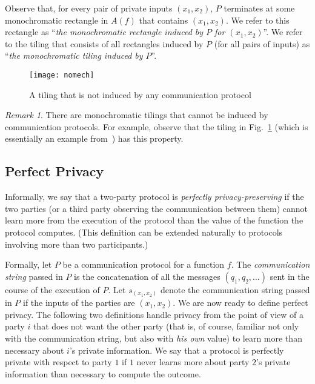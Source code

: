 \documentclass{article}
\theoremstyle{theorem}
\theoremstyle{definition}
\theoremstyle{remark}
\newtheorem{remark}[theorem]{Remark}
\begin{document}
Observe that, for every pair of private inputs $(x_1,x_2)$, $P$
terminates at some monochromatic rectangle in $A(f)$ that contains
$(x_1,x_2)$. We refer to this rectangle as ``\emph{the monochromatic
rectangle induced by $P$ for $(x_1,x_2)$}''. We refer to the tiling
that consists of all rectangles induced by $P$ (for all pairs of
inputs) as  ``\emph{the monochromatic tiling induced by $P$}''.


\begin{figure}[htp]
\begin{center}
\texttt{[image: nomech]}
\caption{\small A tiling that is not induced by any communication
protocol~\cite{K92}}\label{fig:nomech}
\end{center}
\end{figure}

\begin{remark}
There are monochromatic tilings that cannot be induced by communication
protocols. For example, observe that the tiling in
Fig.~\ref{fig:nomech} (which is essentially an example from~\cite{K92}) has this property.
\end{remark}


\subsection{Perfect Privacy}\label{subsec_perfect-privacy}

Informally, we say that a two-party protocol is \emph{perfectly
privacy-preserving} if the two parties (or a third party observing
the communication between them) cannot learn more from the execution
of the protocol than the value of the function the protocol
computes.  (This definition can be extended naturally to protocols
involving more than two participants.)

Formally, let $P$ be a communication protocol for a function $f$.
The \emph{communication string} passed in $P$ is the concatenation
of all the messages $(q_1,q_2, \ldots)$ sent in the course of the
execution of $P$. Let $s_{(x_1,x_2)}$ denote the communication
string passed in $P$ if the inputs of the parties are $(x_1,x_2)$.
We are now ready to define perfect privacy. The following two
definitions handle privacy from the point of view of a party $i$
that does not want the other party (that is, of course, familiar not
only with the communication string, but also with \emph{his own}
value) to learn more than necessary about $i$'s private information.
We say that a protocol is perfectly private with respect to party
$1$ if $1$ never learns more about party $2$'s private information
than necessary to compute the outcome.
\end{document}
